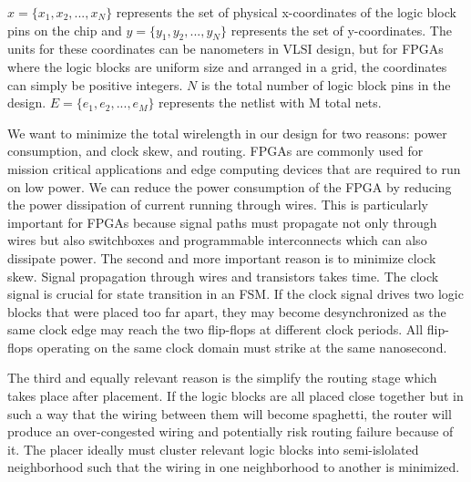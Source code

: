 \documentclass{article}
\begin{document}
\( x = \{ x_{1}, x_{2}, ..., x_{N} \} \) represents the set of physical x-coordinates of the logic block pins on the chip and \( y = \{ y_{1}, y_{2}, ..., y_{N} \} \) represents the set of y-coordinates.
The units for these coordinates can be nanometers in VLSI design, but for FPGAs where the logic blocks are uniform size and arranged in a grid, the coordinates can simply be positive integers.
\( N \) is the total number of logic block pins in the design. \( E = \{ e_{1}, e_{2}, ..., e_{M} \} \) represents the netlist with M total nets.

We want to minimize the total wirelength in our design for two reasons: power consumption, and clock skew, and routing.
FPGAs are commonly used for mission critical applications and edge computing devices that are required to run on low power.
We can reduce the power consumption of the FPGA by reducing the power dissipation of current running through wires.
This is particularly important for FPGAs because signal paths must propagate not only through wires but also switchboxes and programmable interconnects which can also dissipate power.
The second and more important reason is to minimize clock skew. 
Signal propagation through wires and transistors takes time. 
The clock signal is crucial for state transition in an FSM.
If the clock signal drives two logic blocks that were placed too far apart, they may become desynchronized as the same clock edge may reach the two flip-flops at different clock periods.
All flip-flops operating on the same clock domain must strike at the same nanosecond.

The third and equally relevant reason is the simplify the routing stage which takes place after placement.
If the logic blocks are all placed close together but in such a way that the wiring between them will become spaghetti, the router will produce an over-congested wiring and potentially risk routing failure because of it. 
The placer ideally must cluster relevant logic blocks into semi-islolated neighborhood such that the wiring in one neighborhood to another is minimized.
\end{document}
